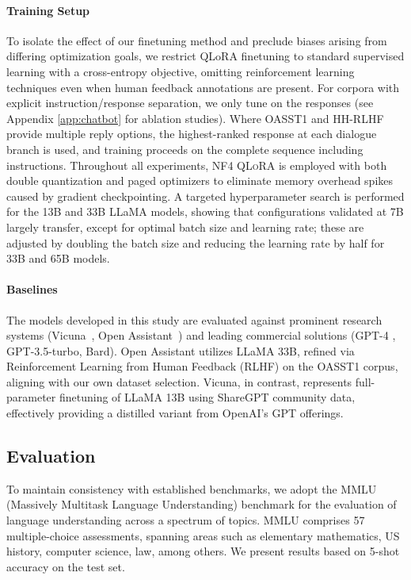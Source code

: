 \paragraph{Training Setup} To isolate the effect of our finetuning method and preclude biases arising from differing optimization goals, we restrict QLoRA finetuning to standard supervised learning with a cross-entropy objective, omitting reinforcement learning techniques even when human feedback annotations are present. For corpora with explicit instruction/response separation, we only tune on the responses (see Appendix \ref{app:chatbot} for ablation studies). Where OASST1 and HH-RLHF provide multiple reply options, the highest-ranked response at each dialogue branch is used, and training proceeds on the complete sequence including instructions. Throughout all experiments, NF4 \textsc{QLoRA} is employed with both double quantization and paged optimizers to eliminate memory overhead spikes caused by gradient checkpointing. A targeted hyperparameter search is performed for the 13B and 33B LLaMA models, showing that configurations validated at 7B largely transfer, except for optimal batch size and learning rate; these are adjusted by doubling the batch size and reducing the learning rate by half for 33B and 65B models.

\paragraph{Baselines} The models developed in this study are evaluated against prominent research systems (Vicuna~\citep{vicuna2023}, Open Assistant~\citep{kopf2023openassistant}) and leading commercial solutions (GPT-4 \citep{openai2023gpt}, GPT-3.5-turbo, Bard). Open Assistant utilizes LLaMA 33B, refined via Reinforcement Learning from Human Feedback (RLHF) on the OASST1 corpus, aligning with our own dataset selection. Vicuna, in contrast, represents full-parameter finetuning of LLaMA 13B using ShareGPT community data, effectively providing a distilled variant from OpenAI's GPT offerings.

\subsection{Evaluation}

To maintain consistency with established benchmarks, we adopt the MMLU (Massively Multitask Language Understanding) benchmark \citep{hendrycksmeasuring} for the evaluation of language understanding across a spectrum of topics. MMLU comprises 57 multiple-choice assessments, spanning areas such as elementary mathematics, US history, computer science, law, among others. We present results based on 5-shot accuracy on the test set.

